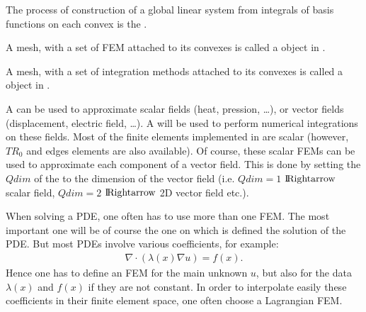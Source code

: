 \documentclass[a4paper,11pt,english]{sphinxmanual}
\begin{document}
\sphinxAtStartPar
The process of construction of a global linear system from integrals of basis
functions on each convex is the .

\sphinxAtStartPar
A mesh, with a set of FEM attached to its convexes is called a 
object in .

\sphinxAtStartPar
A mesh, with a set of integration methods attached to its convexes is called a
 object in .

\sphinxAtStartPar
A  can be used to approximate scalar fields (heat, pression, …), or vector
fields (displacement, electric field, …). A  will be used to perform
numerical integrations on these fields. Most of the finite elements implemented in
 are scalar (however, \(TR_0\) and edges elements are also available). Of
course, these scalar FEMs can be used to approximate each component of a vector
field. This is done by setting the \(Qdim\) of the  to the dimension of
the vector field (i.e. \(Qdim=1\) \(\rm I\hspace{-0.15em}Rightarrow\) scalar field,
\(Qdim=2\) \(\rm I\hspace{-0.15em}Rightarrow\) 2D vector field etc.).

\sphinxAtStartPar
When solving a PDE, one often has to use more than one FEM. The most important one
will be of course the one on which is defined the solution of the PDE. But most
PDEs involve various coefficients, for example:
\begin{equation*}
\begin{split}\nabla\cdot(\lambda(x)\nabla u) = f(x).\end{split}
\end{equation*}
\sphinxAtStartPar
Hence one has to define an FEM for the main unknown \(u\), but also for the
data \(\lambda(x)\) and \(f(x)\) if they are not constant. In order to
interpolate easily these coefficients in their finite element space, one often
choose a Lagrangian FEM.
\end{document}
